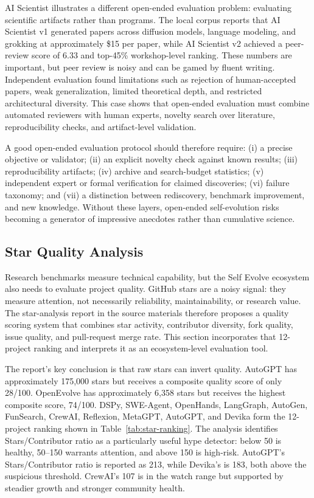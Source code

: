 AI Scientist illustrates a different open-ended evaluation problem: evaluating scientific artifacts rather than programs. The local corpus reports that AI Scientist v1 generated papers across diffusion models, language modeling, and grokking at approximately \$15 per paper, while AI Scientist v2 achieved a peer-review score of 6.33 and top-45\% workshop-level ranking. These numbers are important, but peer review is noisy and can be gamed by fluent writing. Independent evaluation found limitations such as rejection of human-accepted papers, weak generalization, limited theoretical depth, and restricted architectural diversity. This case shows that open-ended evaluation must combine automated reviewers with human experts, novelty search over literature, reproducibility checks, and artifact-level validation.

A good open-ended evaluation protocol should therefore require: (i) a precise objective or validator; (ii) an explicit novelty check against known results; (iii) reproducibility artifacts; (iv) archive and search-budget statistics; (v) independent expert or formal verification for claimed discoveries; (vi) failure taxonomy; and (vii) a distinction between rediscovery, benchmark improvement, and new knowledge. Without these layers, open-ended self-evolution risks becoming a generator of impressive anecdotes rather than cumulative science.

\subsection{Star Quality Analysis}
\label{subsec:star-quality-analysis}

Research benchmarks measure technical capability, but the Self Evolve ecosystem also needs to evaluate project quality. GitHub stars are a noisy signal: they measure attention, not necessarily reliability, maintainability, or research value. The star-analysis report in the source materials therefore proposes a quality scoring system that combines star activity, contributor diversity, fork quality, issue quality, and pull-request merge rate. This section incorporates that 12-project ranking and interprets it as an ecosystem-level evaluation tool.

The report's key conclusion is that raw stars can invert quality. AutoGPT has approximately 175,000 stars but receives a composite quality score of only 28/100. OpenEvolve has approximately 6,358 stars but receives the highest composite score, 74/100. DSPy, SWE-Agent, OpenHands, LangGraph, AutoGen, FunSearch, CrewAI, Reflexion, MetaGPT, AutoGPT, and Devika form the 12-project ranking shown in Table~\ref{tab:star-ranking}. The analysis identifies Stars/Contributor ratio as a particularly useful hype detector: below 50 is healthy, 50--150 warrants attention, and above 150 is high-risk. AutoGPT's Stars/Contributor ratio is reported as 213, while Devika's is 183, both above the suspicious threshold. CrewAI's 107 is in the watch range but supported by steadier growth and stronger community health.

